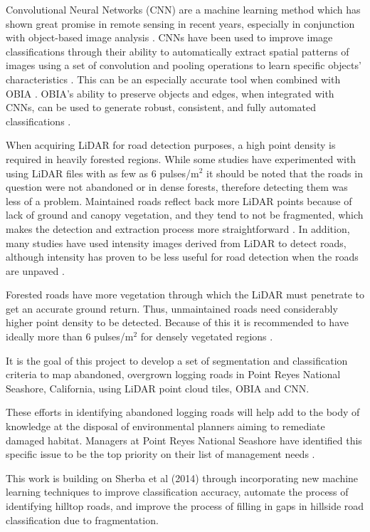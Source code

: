\documentclass[remotesensing,article,submit,pdftex,moreauthors]{Definitions/mdpi}
\begin{document}
Convolutional Neural Networks (CNN) are a machine learning method which has shown great promise in remote sensing in recent years, especially in conjunction with object-based image analysis \cite{ferreira}. CNNs have been used to improve image classifications through their ability to automatically extract spatial patterns of images using a set of convolution and pooling operations to learn specific objects’ characteristics \cite{zhang}. This can be an especially accurate tool when combined with OBIA \cite{martins}. OBIA’s ability to preserve objects and edges, when integrated with CNNs, can be used to generate robust, consistent, and fully automated classifications \cite{robson}.

When acquiring LiDAR for road detection purposes, a high point density is required in heavily forested regions. While some studies have experimented with using LiDAR files with as few as 6 pulses/m$^2$ \cite{white} it should be noted that the roads in question were not abandoned or in dense forests, therefore detecting them was less of a problem. Maintained roads reflect back more LiDAR points because of lack of ground and canopy vegetation, and they tend to not be fragmented, which makes the detection and extraction process more straightforward \cite{li}. In addition, many studies have used intensity images derived from LiDAR to detect roads, although intensity has proven to be less useful for road detection when the roads are unpaved \cite{yong, white}.  

Forested roads have more vegetation through which the LiDAR must penetrate to get an accurate ground return. Thus, unmaintained roads need considerably higher point density to be detected. Because of this it is recommended to have ideally more than 6 pulses/m$^2$ for densely vegetated regions \cite{sherba}. 

It is the goal of this project to develop a set of segmentation and classification criteria to map abandoned, overgrown logging roads in Point Reyes National Seashore, California, using LiDAR point cloud tiles, OBIA and CNN. 

These efforts in identifying abandoned logging roads will help add to the body of knowledge at the disposal of environmental planners aiming to remediate damaged habitat. Managers at Point Reyes National Seashore have identified this specific issue to be the top   priority on their list of management needs \cite{becker}.

This work is building on Sherba et al (2014) \cite{sherba} through incorporating new machine learning techniques to improve classification accuracy, automate the process of identifying hilltop roads, and improve the process of filling in gaps in hillside road classification due to fragmentation.
\end{document}
